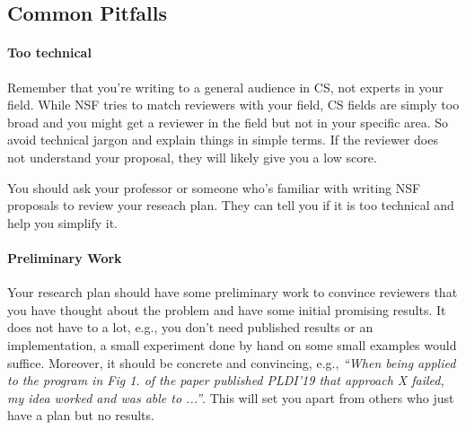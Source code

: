 \documentclass[oneside,11pt,dvipsnames]{book}
\begin{document}
\subsection{Common Pitfalls}

\paragraph{Too technical} Remember that you're writing to a general audience in CS, not experts in your field.  While NSF tries to match reviewers with your field, CS fields are simply too broad and you might get a reviewer in the field but not in your specific area. 
So avoid technical jargon and explain things in simple terms. If the reviewer does not understand your proposal, they will likely give you a low score.

You should ask your professor or someone who's familiar with writing NSF proposals to review your reseach plan.  They can tell you if it is too technical and help you simplify it.

\paragraph{Preliminary Work} Your research plan should have some preliminary work to convince reviewers that you have thought about the problem and have some initial promising results.  It does not have to a lot, e.g., you don't need published results or an implementation, a small experiment done by hand on some small examples would suffice.  Moreover, it should be concrete and convincing, e.g., \emph{``When being applied to the program in Fig 1. of the paper published PLDI'19 that approach X failed, my idea worked and was able to ...''}.  This will set you apart from others who just have a plan but no results.


\end{document}
